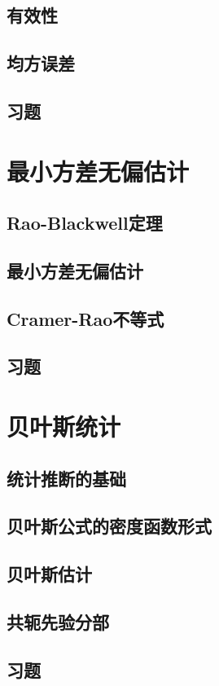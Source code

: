 \subsection{有效性}
\subsection{均方误差}
\subsection{习题}

\section{最小方差无偏估计}
\subsection{Rao-Blackwell定理}
\subsection{最小方差无偏估计}
\subsection{Cramer-Rao不等式}
\subsection{习题}

\section{贝叶斯统计}
\subsection{统计推断的基础}
\subsection{贝叶斯公式的密度函数形式}
\subsection{贝叶斯估计}
\subsection{共轭先验分部}
\subsection{习题}

